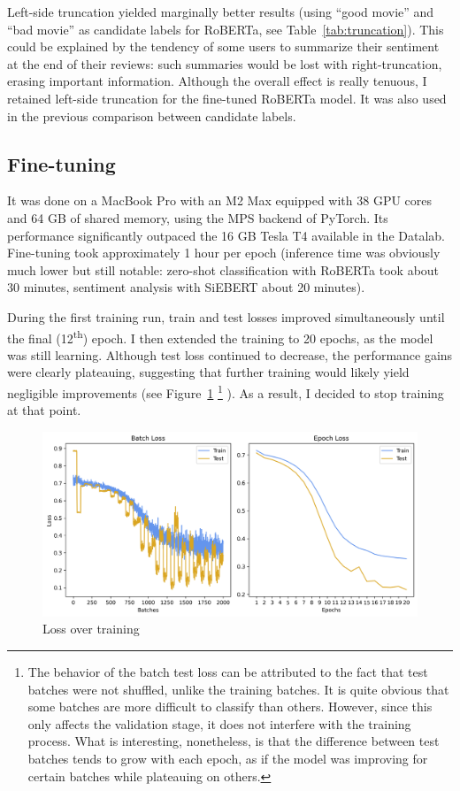 \documentclass{article}
\begin{document}
Left-side truncation yielded marginally better results (using \enquote{good movie} and \enquote{bad movie} as candidate labels for RoBERTa, see Table~\ref{tab:truncation}). This could be explained by the tendency of some users to summarize their sentiment at the end of their reviews: such summaries would be lost with right-truncation, erasing important information. Although the overall effect is really tenuous, I retained left-side truncation for the fine-tuned RoBERTa model. It was also used in the previous comparison between candidate labels.

\subsection{Fine-tuning}

It was done on a MacBook Pro with an M2 Max equipped with 38 GPU cores and 64 GB of shared memory, using the MPS backend of PyTorch. Its performance significantly outpaced the 16 GB Tesla T4 available in the Datalab. Fine-tuning took approximately 1 hour per epoch (inference time was obviously much lower but still notable: zero-shot classification with RoBERTa took about 30 minutes, sentiment analysis with SiEBERT about 20 minutes). 

During the first training run, train and test losses improved simultaneously until the final (12\textsuperscript{th}) epoch. I then extended the training to 20 epochs, as the model was still learning. Although test loss continued to decrease, the performance gains were clearly plateauing, suggesting that further training would likely yield negligible improvements (see Figure~\ref{fig:roberta-learning-1} 
\footnote{The behavior of the batch test loss can be attributed to the fact that test batches were not shuffled, unlike the training batches. It is quite obvious that some batches are more difficult to classify than others. However, since this only affects the validation stage, it does not interfere with the training process. What is interesting, nonetheless, is that the difference between test batches tends to grow with each epoch, as if the model was improving for certain batches while plateauing on others.}
). As a result, I decided to stop training at that point.

\begin{figure}
  \centering
  \includegraphics[width=\textwidth]{RoBERTa_learning_curves_1}
  \caption{Loss over training}
  \label{fig:roberta-learning-1}
\end{figure}
\end{document}
